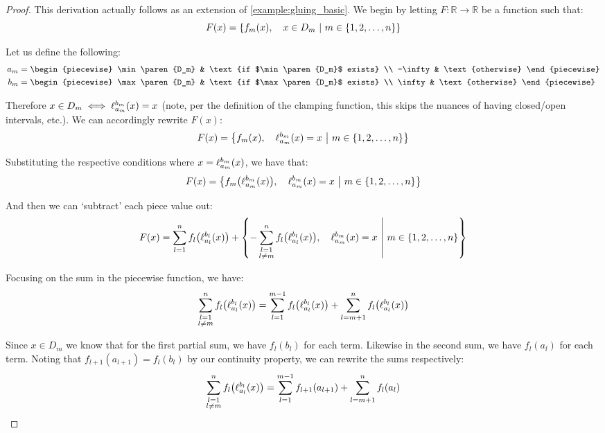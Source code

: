 \begin{proof}
    This derivation actually follows as an extension of \autoref{example:gluing_basic}. We begin by letting $F:\mathbb{R}\to\mathbb{R}$ be a function such that:
    $$
        F(x) = \left\{f_m(x),\quad x\in D_m\ \middle|\ m\in\{1,2,\dots,n\}\right\}
    $$

    Let us define the following:
    \begin{align*}
        a_m &= \begin{piecewise}
            \min\paren{D_m} & \text{if $\min\paren{D_m}$ exists} \\
            -\infty & \text{otherwise}
        \end{piecewise} \\
        b_m &= \begin{piecewise}
            \max\paren{D_m} & \text{if $\max\paren{D_m}$ exists} \\
            \infty & \text{otherwise}
        \end{piecewise}
    \end{align*}

    Therefore $x\in D_m\iff \ell_{a_m}^{b_m}(x)=x$ (note, per the definition of the clamping function, this skips the nuances of having closed/open intervals, etc.). We can accordingly rewrite $F(x)$:
    $$
        F(x) = \left\{f_m(x),\quad \ell_{a_m}^{b_m}(x)=x\ \middle|\ m\in\{1,2,\dots,n\}\right\}
    $$

    Substituting the respective conditions where $x=\ell_{a_m}^{b_m}(x)$, we have that:
    $$
        F(x) = \pwobj{f_m\paren*{\ell_{a_m}^{b_m}\paren{x}}}{\ell_{a_m}^{b_m}\paren{x}=x}{m\in\br{1,2,\dots,n}}
    $$

    And then we can `subtract' each piece value out:
    $$
        F(x) = \sum_{l=1}^{n}{f_l\paren*{\ell_{a_l}^{b_l}\paren{x}}}+\pwobj{-\sum_{\substack{l=1\\l\neq m}}^{n}{f_l\paren*{\ell_{a_l}^{b_l}\paren{x}}}}{\ell_{a_m}^{b_m}\paren{x}=x}{m\in\br{1,2,\dots,n}}
    $$

    Focusing on the sum in the piecewise function, we have:
    $$
        \sum_{\substack{l=1\\l\neq m}}^{n}{f_l\paren*{\ell_{a_l}^{b_l}\paren{x}}} = \sum_{l=1}^{m-1}{f_l\paren*{\ell_{a_l}^{b_l}\paren{x}}}+\sum_{l=m+1}^{n}{f_l\paren*{\ell_{a_l}^{b_l}\paren{x}}}
    $$

    Since $x\in D_m$ we know that for the first partial sum, we have $f_l(b_l)$ for each term. Likewise in the second sum, we have $f_l(a_l)$ for each term. Noting that $f_{l+1}(a_{l+1})=f_l(b_l)$ by our continuity property, we can rewrite the sums respectively:
    $$
        \sum_{\substack{l=1\\l\neq m}}^{n}{f_l\paren*{\ell_{a_l}^{b_l}\paren{x}}} = \sum_{l=1}^{m-1}{f_{l+1}\paren*{a_{l+1}}}+\sum_{l=m+1}^{n}{f_l\paren*{a_l}}
    $$


\end{proof}

